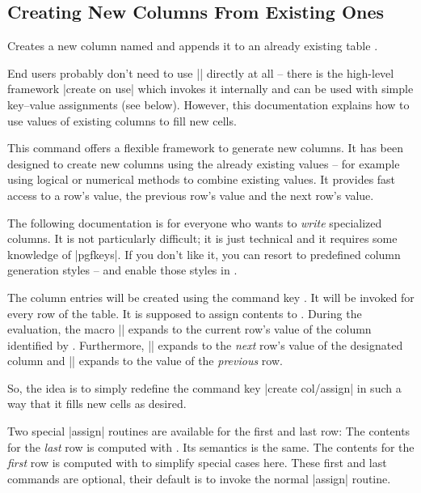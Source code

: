 \documentclass[a4paper]{ltxdoc}
\begin{document}
\subsection{Creating New Columns From Existing Ones}

\begin{command}{\pgfplotstablecreatecol{}}
    Creates a new column named  and appends it to an already
    existing table .

    End users probably don't need to use |\pgfplotstablecreatecol| directly at
    all -- there is the high-level framework |create on use| which invokes it
    internally and can be used with simple key--value assignments (see below).
    However, this documentation explains how to use values of existing columns
    to fill new cells.

    This command offers a flexible framework to generate new columns. It has
    been designed to create new columns using the already existing values --
    for example using logical or numerical methods to combine existing values.
    It provides fast access to a row's value, the previous row's value and the
    next row's value.

    The following documentation is for everyone who wants to \emph{write}
    specialized columns. It is not particularly difficult; it is just technical
    and it requires some knowledge of |pgfkeys|. If you don't like it, you can
    resort to predefined column generation styles -- and enable those styles in
    .

    The column entries will be created using the command key
    .
    It will be invoked for every row of the table. It is supposed to assign
    contents to
    .
    During the evaluation, the macro |\thisrow| expands to the
    current row's value of the column identified by .
    Furthermore, |\nextrow| expands to the \emph{next} row's
    value of the designated column and |\prevrow| expands to the
    value of the \emph{previous} row.

    So, the idea is to simply redefine the command key |create col/assign| in
    such a way that it fills new cells as desired.

    Two special |assign| routines are available for the first and last row: The
    contents for the \emph{last} row is computed with
    .
    Its semantics is the same. The contents for the \emph{first} row is
    computed with
    to simplify special cases here. These first and last commands are optional,
    their default is to invoke the normal |assign| routine.


\end{command}
\end{document}
